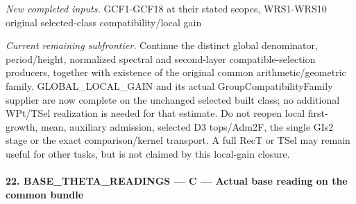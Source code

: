 \emph{New completed inputs.} GCF1-GCF18 at their stated scopes, WRS1-WRS10 original selected-class compatibility/local gain

\emph{Current remaining subfrontier.} Continue the distinct global denominator, period/height, normalized spectral and second-layer compatible-selection producers, together with existence of the original common arithmetic/geometric family. GLOBAL\_\allowbreak LOCAL\_\allowbreak GAIN and its actual GroupCompatibilityFamily supplier are now complete on the unchanged selected built class; no additional WPt/TSel realization is needed for that estimate. Do not reopen local first-growth, mean, auxiliary admission, selected D3 tops/Adm2F, the single GIs2 stage or the exact comparison/kernel transport. A full RecT or TSel may remain useful for other tasks, but is not claimed by this local-gain closure.



\paragraph{22. BASE\_\allowbreak THETA\_\allowbreak READINGS — C — Actual base reading on the common bundle}


